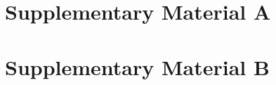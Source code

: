 \documentclass[journal]{IEEEtran}
\begin{document}











\clearpage
\section*{Supplementary Material A}

\clearpage
\onecolumn 
\section*{Supplementary Material B}

\end{document}
